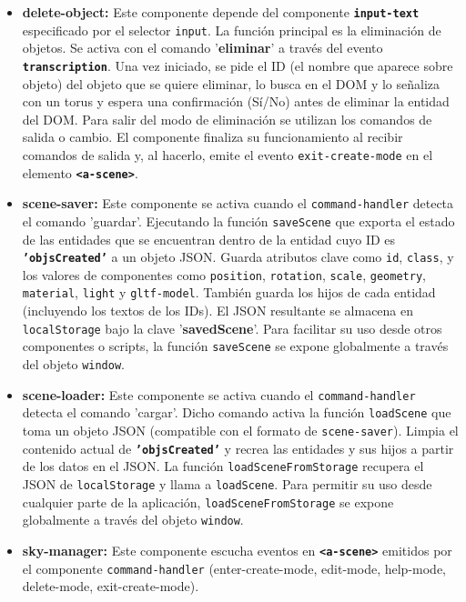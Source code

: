 \documentclass[a4paper, 12pt]{book}
\begin{document}
\begin{itemize}
  \item \textbf{delete-object:}
Este componente depende del componente \texttt{\textbf{input-text}} especificado por el selector \texttt{input}.
La función principal es la eliminación de objetos.
Se activa con el comando '\textbf{eliminar}' a través del evento \texttt{\textbf{transcription}}.
Una vez iniciado, se pide el ID (el nombre que aparece sobre objeto) del objeto que se quiere eliminar, lo busca en el DOM y lo señaliza con un torus y espera una confirmación (Sí/No) antes de eliminar la entidad del DOM.
Para salir del modo de eliminación se utilizan los comandos de salida o cambio.
El componente finaliza su funcionamiento al recibir comandos de salida y, al hacerlo, emite el evento \texttt{exit-create-mode} en el elemento \texttt{\textbf{<a-scene>}}.
\\
  \item \textbf{scene-saver:}
Este componente se activa cuando el \texttt{command-handler} detecta el comando 'guardar'.
Ejecutando la función \texttt{saveScene} que exporta el estado de las entidades que se encuentran dentro de la entidad cuyo ID es \texttt{\textbf{'objsCreated'}} a un objeto JSON. Guarda atributos clave como \texttt{id}, \texttt{class}, y los valores de componentes como \texttt{position}, \texttt{rotation}, \texttt{scale}, \texttt{geometry}, \texttt{material}, \texttt{light} y \texttt{gltf-model}. También guarda los hijos de cada entidad (incluyendo los textos de los IDs).
El JSON resultante se almacena en \texttt{localStorage} bajo la clave '\textbf{savedScene}'.
Para facilitar su uso desde otros componentes o scripts, la función \texttt{saveScene} se expone globalmente a través del objeto \texttt{window}.
  \item \textbf{scene-loader:}
Este componente se activa cuando el \texttt{command-handler} detecta el comando 'cargar'.
Dicho comando activa la función \texttt{loadScene} que toma un objeto JSON (compatible con el formato de \texttt{scene-saver}).
Limpia el contenido actual de \texttt{\textbf{'objsCreated'}} y recrea las entidades y sus hijos a partir de los datos en el JSON.
La función \texttt{loadSceneFromStorage} recupera el JSON de \texttt{localStorage} y llama a \texttt{loadScene}.
Para permitir su uso desde cualquier parte de la aplicación, \texttt{loadSceneFromStorage} se expone globalmente a través del objeto \texttt{window}.
  \item \textbf{sky-manager:}
Este componente escucha eventos en \texttt{\textbf{<a-scene>}} emitidos por el componente \texttt{command-handler} (enter-create-mode, edit-mode, help-mode, delete-mode, exit-create-mode).

\end{itemize}
\end{document}
